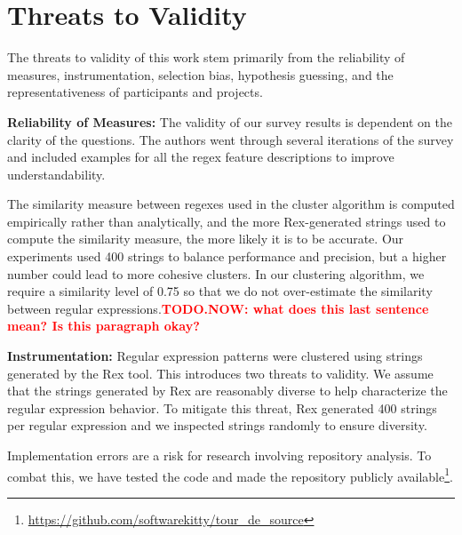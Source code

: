 \documentclass{sig-alternate}
\newcommand{\todoNow}[1]{\textbf{\textcolor{red}{TODO.NOW: #1}}} %
\begin{document}










\section{Threats to Validity}
\label{sec:threats}
The threats to validity of this work stem primarily from the reliability of measures, instrumentation, selection bias, hypothesis guessing, and the representativeness of participants and projects.

\textbf{Reliability of Measures:} The validity of our survey results is dependent on the clarity of the questions. The authors went through several iterations of the survey and included examples for all the regex feature descriptions to improve understandability.

The similarity measure between regexes used in the cluster algorithm is computed empirically rather than analytically, and the more Rex-generated strings used to compute the similarity measure, the more likely it is to be accurate. Our experiments used 400 strings to balance performance and precision, but a higher number could lead to more cohesive clusters. In our clustering algorithm, we require a similarity level of 0.75 so that we do not over-estimate the similarity between regular  expressions.\todoNow{what does this last sentence mean?  Is this paragraph okay?}


\textbf{Instrumentation:} Regular expression patterns were clustered using strings generated by the Rex tool. This introduces two threats to validity. We assume that the strings generated by Rex are reasonably diverse to help characterize the regular expression behavior. To mitigate this threat, Rex generated 400 strings per regular expression and we inspected strings randomly to ensure diversity.

Implementation errors are a risk for research involving repository analysis. To combat this, we have tested the code and made the repository publicly available\footnote{\url{https://github.com/softwarekitty/tour_de_source}}.
\end{document}
